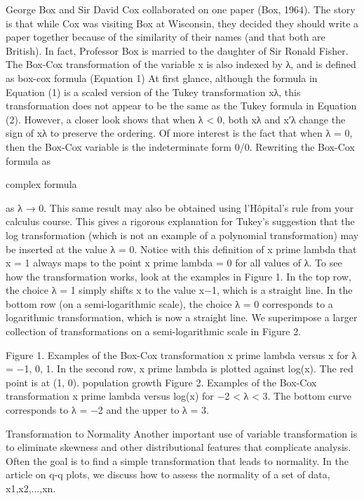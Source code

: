 
George Box and Sir David Cox collaborated on one paper (Box, 1964). The story is that while Cox was visiting Box at Wisconsin, they decided they should write a paper together because of the similarity of their names (and that both are British). In fact, Professor Box is married to the daughter of Sir Ronald Fisher.
The Box-Cox transformation of the variable x is also indexed by λ, and is defined as
box-cox formula  (Equation 1)
At first glance, although the formula in Equation (1) is a scaled version of the Tukey transformation xλ, this transformation does not appear to be the same as the Tukey formula in Equation (2). However, a closer look shows that when λ < 0, both xλ and x′λ change the sign of xλ to preserve the ordering. Of more interest is the fact that when λ = 0, then the Box-Cox variable is the indeterminate form 0/0. Rewriting the Box-Cox formula as

complex formula

as λ → 0. This same result may also be obtained using l'Hôpital's rule from your calculus course. This gives a rigorous explanation for Tukey's suggestion that the log transformation (which is not an example of a polynomial transformation) may be inserted at the value λ = 0.
Notice with this definition of x prime lambda that x = 1 always maps to the point  x prime lambda = 0 for all values of λ. To see how the transformation works, look at the examples in Figure 1. In the top row, the choice λ = 1 simply shifts x to the value x−1, which is a straight line. In the bottom row (on a semi-logarithmic scale), the choice λ = 0 corresponds to a logarithmic transformation, which is now a straight line. We superimpose a larger collection of transformations on a semi-logarithmic scale in Figure 2.

Figure 1. Examples of the Box-Cox transformation x prime lambda versus x for λ = −1, 0, 1. In the second row, x prime lambda is plotted against log(x). The red point is at (1, 0).
population growth
Figure 2. Examples of the Box-Cox transformation x prime lambda versus log(x) for −2 < λ < 3. The bottom curve corresponds to λ = −2 and the upper to λ = 3.
 
Transformation to Normality
Another important use of variable transformation is to eliminate skewness and other distributional features that complicate analysis. Often the goal is to find a simple transformation that leads to normality. In the article on q-q plots, we discuss how to assess the normality of a set of data,
x1,x2,...,xn.

